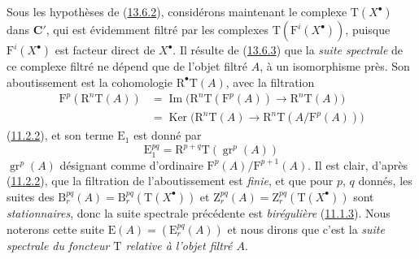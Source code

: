 \begin{env}[13.6.4]
\label{0.13.6.4-fr}
Sous les hypothèses de (\hyperref[0.13.6.2-fr]{13.6.2}), considérons
maintenant le complexe $\mathrm T(X^\bullet)$ dans $\boldsymbol{C}'$, qui est
évidemment filtré par les complexes
$\mathrm T(\mathrm F^i(X^\bullet))$, puisque
$\mathrm F^i(X^\bullet)$ est facteur direct de $X^\bullet$. Il résulte de
(\hyperref[0.13.6.3-fr]{13.6.3}) que la \emph{suite spectrale} de ce
complexe filtré ne dépend que de l'objet filtré $A$, à un isomorphisme
près. Son aboutissement est la cohomologie $\mathrm R^\bullet\mathrm T(A)$,
avec la filtration
\begin{equation}
\label{0.13.6.4.1-fr}
\tag{13.6.4.1}
\begin{split}
\mathrm F^p(\mathrm R^n\mathrm T(A))
&=\operatorname{Im}\bigl(\mathrm R^n\mathrm T(\mathrm F^p(A))
\longrightarrow\mathrm R^n\mathrm T(A)\bigr)\\
&=\operatorname{Ker}\bigl(\mathrm R^n\mathrm T(A)
\longrightarrow\mathrm R^n\mathrm T(A/\mathrm F^p(A))\bigr)
\end{split}
\end{equation}
(\hyperref[0.11.2.2-fr]{11.2.2}), et son terme $\mathrm E_1$ est donné
par
\begin{equation}
\label{0.13.6.4.2-fr}
\tag{13.6.4.2}
\mathrm E_1^{pq}=\mathrm R^{p+q}\mathrm T(\operatorname{gr}^p(A))
\end{equation}
$\operatorname{gr}^p(A)$ désignant comme d'ordinaire
$\mathrm F^p(A)/\mathrm F^{p+1}(A)$. Il est clair, d'après
(\hyperref[0.11.2.2-fr]{11.2.2}), que la filtration de l'aboutissement
est \emph{finie}, et que pour $p$, $q$ donnés, les suites des
$\mathrm B_r^{pq}(A)=\mathrm B_r^{pq}(\mathrm T(X^\bullet))$ et
$\mathrm Z_r^{pq}(A)=\mathrm Z_r^{pq}(\mathrm T(X^\bullet))$ sont
\emph{stationnaires}, donc la suite spectrale précédente est \emph{birégulière}
(\hyperref[0.11.1.3-fr]{11.1.3}). Nous noterons cette suite
$\mathrm E(A)=(\mathrm E_r^{pq}(A))$ et nous dirons que c'est la
\emph{suite spectrale du foncteur $\mathrm T$ relative à l'objet filtré
$A$}.
\end{env}

